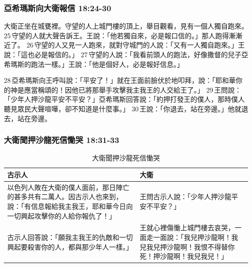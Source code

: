 \subsubsection{亞希瑪斯向大衛報信 18:24-30}
大衛正坐在城甕裡。守望的人上城門樓的頂上，舉目觀看，見有一個人獨自跑來。 25 守望的人就大聲告訴王。王說：「他若獨自來，必是報口信的。」那人跑得漸漸近了。 26 守望的人又見一人跑來，就對守城門的人說：「又有一人獨自跑來。」王說：「這也必是報信的。」 27 守望的人說：「我看前頭人的跑法，好像撒督的兒子亞希瑪斯的跑法一樣。」王說：「他是個好人，必是報好信息。」

28 亞希瑪斯向王呼叫說：「平安了！」就在王面前臉伏於地叩拜，說：「耶和華你的神是應當稱頌的！因他已將那舉手攻擊我主我王的人交給王了。」 29 王問說：「少年人押沙龍平安不平安？」亞希瑪斯回答說：「約押打發王的僕人，那時僕人聽見眾民大聲喧嘩，卻不知道是什麼事。」 30 王說：「你退去，站在旁邊。」他就退去，站在旁邊。

\subsubsection{大衛聞押沙龍死信慟哭 18:31-33}
\begin{table}[H]
\hspace*{-12mm}
\centering 
\begin{tabular}{p{8.05cm}|p{9.84cm}}\hline\hline
古示人&大衛\\\hline
以色列人敗在大衛的僕人面前，那日陣亡的甚多共有二萬人。因古示人也來到，說：「有信息報給我主我王，耶和華今日向一切興起攻擊你的人給你報仇了！」 
&王問古示人說：「少年人押沙龍平安不平安？」 \\\hline
古示人回答說：「願我主我王的仇敵和一切興起要殺害你的人，都與那少年人一樣。」
&王就心裡傷慟上城門樓去哀哭，一面走一面說：「我兒押沙龍啊！我兒我兒押沙龍啊！我恨不得替你死！押沙龍啊！我兒我兒！」\\\hline
\end{tabular}
\caption{大衛聞押沙龍死信慟哭}
\end{table}

